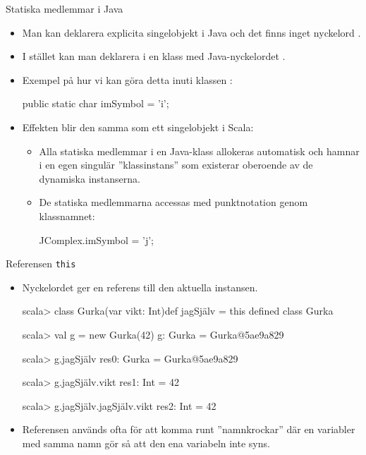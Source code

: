 \begin{Slide}{Statiska medlemmar i Java}
\begin{itemize}
\item Man kan  deklarera explicita singelobjekt i Java och det finns inget nyckelord .

\item I stället kan man deklarera  i en klass med Java-nyckelordet .

\item Exempel på hur vi kan göra detta inuti klassen :

\begin{Code}[language=Java,basicstyle=\SlideFontSize{10}{12}\ttfamily\selectfont]
    public static char imSymbol = 'i';
\end{Code}

\item Effekten blir den samma som ett singelobjekt i Scala: 
\begin{itemize}
\item Alla statiska medlemmar i en Java-klass allokeras automatisk och hamnar i en egen singulär ''klassinstans'' som existerar oberoende av de dynamiska instanserna.
\item De statiska medlemmarna accessas med punktnotation genom klassnamnet:
\begin{Code}[language=Java,basicstyle=\SlideFontSize{11}{13}\ttfamily\selectfont]
    JComplex.imSymbol = 'j';
\end{Code}

\end{itemize}


\end{itemize}
\end{Slide}



\begin{Slide}{Referensen \texttt{this}}\SlideFontSmall
\begin{itemize}
\item Nyckelordet  ger en referens till den aktuella instansen.
\begin{REPLnonum}
scala> class Gurka(var vikt: Int){def jagSjälv = this}
defined class Gurka

scala> val g = new Gurka(42)
g: Gurka = Gurka@5ae9a829

scala> g.jagSjälv
res0: Gurka = Gurka@5ae9a829

scala> g.jagSjälv.vikt
res1: Int = 42

scala> g.jagSjälv.jagSjälv.vikt
res2: Int = 42
\end{REPLnonum}
\item Referensen  används ofta för att komma runt ''namnkrockar'' där en variabler med samma namn gör så att den ena variabeln inte syns.
\end{itemize}
\end{Slide}



